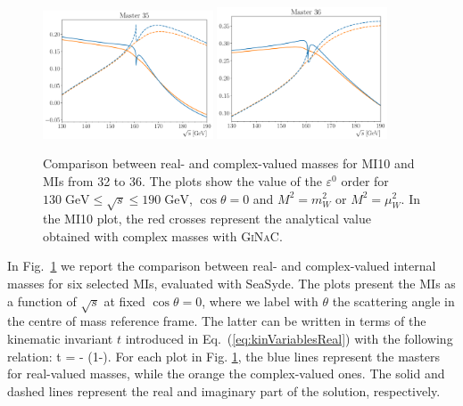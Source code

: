 \begin{figure}[ht!]
    \includegraphics[width=0.45\textwidth]{paperSeaFire/Images/master35.pdf}
    \includegraphics[width=0.45\textwidth]{paperSeaFire/Images/master36.pdf}
    \caption{Comparison between real- and complex-valued masses for MI10 and MIs from 32 to 36. The plots show the value of the $\varepsilon^0$ order  for $130 \; \text{GeV} \le \sqrt{s} \le 190\;\text{GeV}$, $\cos\theta=0$ and $M^2=m_W^2$ or $M^2=\mu_W^2$. 
    In the MI10 plot, the red crosses represent the analytical value obtained with complex masses with \textsc{GiNaC}.}
    \label{fig:compReCoMass}
\end{figure}

In Fig.~\ref{fig:compReCoMass} we report the comparison between real- and complex-valued internal masses for six selected MIs, evaluated with {\sc SeaSyde}.
The plots present the MIs as a function of $\sqrt{s}$ at fixed $\cos\theta=0$, where we label with $\theta$ the scattering angle in the centre of mass reference frame.
The latter can be written in terms of the kinematic invariant $t$ introduced in Eq.~(\ref{eq:kinVariablesReal}) with the following relation:
\be
    t = - \left(1-\cos\theta \right).
    \label{eq:relationTCostheta}
\ee
For each plot in Fig. \ref{fig:compReCoMass}, the blue lines represent the masters for real-valued masses, while the orange the complex-valued ones. The solid and dashed lines represent the real and imaginary part of the solution, respectively.

